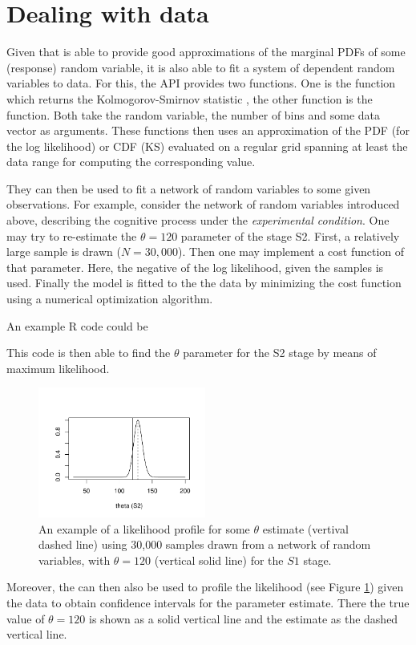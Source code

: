 \section{Dealing with data}
Given that  is able to provide good approximations of the marginal PDFs of some (response) random variable, it is also able to fit a system of dependent random variables to data. For this, the  API provides two functions. One is the  function which returns the Kolmogorov-Smirnov statistic \cite[e.g.,][]{Marsaglia2003}, the other function is the  function. Both take the random variable, the number of bins and some data vector as arguments. These functions then uses an approximation of the PDF (for the log likelihood) or CDF (KS) evaluated on a regular grid spanning at least the data range for computing the corresponding value.

They can then be used to fit a network of random variables to some given observations. For example, consider the network of random variables introduced above, describing the cognitive process under the \emph{experimental condition}. One may try to re-estimate the $\theta=120$ parameter of the stage S2. First, a relatively large sample is drawn ($N=30,000$). Then one may implement a cost function of that parameter. Here, the negative of the log likelihood, given the samples is used. Finally the model is fitted to the the data by minimizing the cost function using a numerical optimization algorithm.

An example R code could be


This code is then able to find the $\theta$ parameter for the S2 stage by means of maximum likelihood. 

\begin{figure}[!ht]
 \centering
 \includegraphics[width=0.49\textwidth]{fig/pod_likelihoodProf.pdf}
 \caption{An example of a likelihood profile for some $\theta$ estimate (vertival dashed line) using 30,000 samples drawn from a network of random variables, with $\theta=120$ (vertical solid line) for the $S1$ stage.} \label{fig:llprof}
\end{figure}

Moreover, the  can then also be used to profile the likelihood (see Figure \ref{fig:llprof}) given the data to obtain confidence intervals for the parameter estimate. There the true value of $\theta=120$ is shown as a solid vertical line and the estimate as the dashed vertical line. 